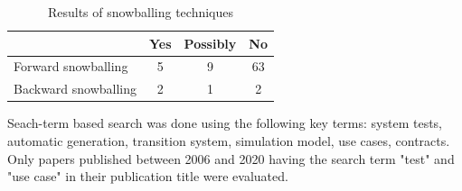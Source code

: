 \begin{table}[h] 
	\centering
	\begin{small}
		\caption{Results of snowballing techniques}
		\label{snowballing}
		\setlength{\tabcolsep}{1em}
		\begin{tabular}{l|c|c|c}
			\hline
			& \textbf{Yes} & \textbf{Possibly} & \textbf{No} \\
			\hline
			\hline	
			Forward snowballing & 5 & 9 & 63 \\
			\hline
			Backward snowballing & 2 & 1 & 2 \\
			\hline
		\end{tabular}
	\end{small}
\end{table}

Seach-term based search was done using the following key terms: system tests, automatic generation, transition system, simulation model, use cases, contracts. Only papers published between 2006 and 2020 having the search term "test" and "use case" in their publication title were evaluated. 

